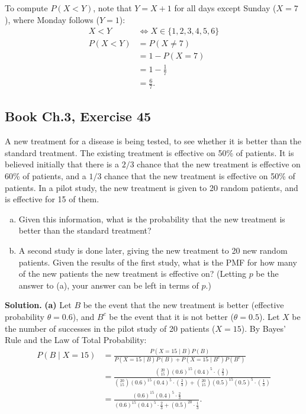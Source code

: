 \documentclass[11pt,a4paper]{article}
\begin{document}
To compute $P(X < Y)$, note that $Y = X + 1$ for all days except Sunday ($X = 7$), where Monday follows ($Y = 1$):
\begin{align*}
X < Y &\iff X \in \{1, 2, 3, 4, 5, 6\} \\
P(X < Y) &= P(X \neq 7) \\
&= 1 - P(X = 7) \\
&= 1 - \frac{1}{7} \\
&= \frac{6}{7}.
\end{align*}

\vspace{10pt}
\subsection{Book Ch.3, Exercise 45}
\begin{tcolorbox}[title={Book Ch.3, Exercise 45}]
A new treatment for a disease is being tested, to see whether it is better than the standard treatment. The existing treatment is effective on 50\% of patients. It is believed initially that there is a $2/3$ chance that the new treatment is effective on 60\% of patients, and a $1/3$ chance that the new treatment is effective on 50\% of patients. In a pilot study, the new treatment is given to 20 random patients, and is effective for 15 of them.
\begin{enumerate}[(a)]
\item Given this information, what is the probability that the new treatment is better than the standard treatment?
\item A second study is done later, giving the new treatment to 20 new random patients. Given the results of the first study, what is the PMF for how many of the new patients the new treatment is effective on? (Letting $p$ be the answer to (a), your answer can be left in terms of $p$.)
\end{enumerate}
\end{tcolorbox}

\noindent \textbf{Solution.} \textbf{(a)} Let $B$ be the event that the new treatment is better (effective probability $\theta = 0.6$), and $B^c$ be the event that it is not better ($\theta = 0.5$). Let $X$ be the number of successes in the pilot study of 20 patients ($X = 15$). By Bayes' Rule and the Law of Total Probability:
\begin{align*}
P(B \mid X = 15) &= \frac{P(X = 15 \mid B) P(B)}{P(X = 15 \mid B) P(B) + P(X = 15 \mid B^c) P(B^c)} \\
&= \frac{\binom{20}{15} (0.6)^{15} (0.4)^5 \cdot \left(\frac{2}{3}\right)}{\binom{20}{15} (0.6)^{15} (0.4)^5 \cdot \left(\frac{2}{3}\right) + \binom{20}{15} (0.5)^{15} (0.5)^5 \cdot \left(\frac{1}{3}\right)} \\
&= \frac{(0.6)^{15} (0.4)^5 \cdot \frac{2}{3}}{(0.6)^{15} (0.4)^5 \cdot \frac{2}{3} + (0.5)^{20} \cdot \frac{1}{3}}.
\end{align*}
\end{document}
